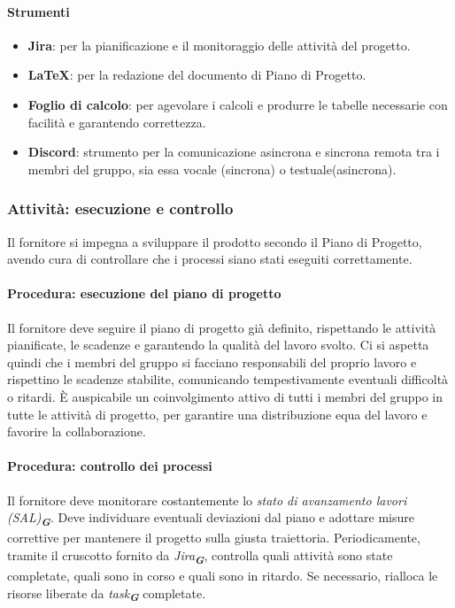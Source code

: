 \documentclass[a4paper,12pt]{article}
\newcommand{\glossario}[1]{\textit{#1}\textsubscript{\textbf{\textit{\textcolor{lightblack}{G}}}}}
\begin{document}
\paragraph{Strumenti}
\begin{itemize}
    \item \textbf{Jira}: per la pianificazione e il monitoraggio delle attività del progetto.
    \item \textbf{\LaTeX}: per la redazione del documento di Piano di Progetto.
    \item \textbf{Foglio di calcolo}: per agevolare i calcoli e produrre le tabelle necessarie con facilità e garantendo correttezza.
    \item \textbf{Discord}: strumento per la comunicazione asincrona e sincrona remota tra i membri del gruppo, sia essa vocale (sincrona) o testuale(asincrona).
\end{itemize}

\subsubsection{Attività: esecuzione e controllo}
Il fornitore si impegna a sviluppare il prodotto secondo il Piano di Progetto,
avendo cura di controllare che i processi siano stati eseguiti correttamente.

\paragraph{Procedura: esecuzione del piano di progetto}
Il fornitore deve seguire il piano di progetto già definito, rispettando le
attività pianificate, le scadenze e garantendo la qualità del lavoro svolto. Ci
si aspetta quindi che i membri del gruppo si facciano responsabili del proprio
lavoro e rispettino le scadenze stabilite, comunicando tempestivamente
eventuali difficoltà o ritardi. È auspicabile un coinvolgimento attivo di tutti
i membri del gruppo in tutte le attività di progetto, per garantire una
distribuzione equa del lavoro e favorire la collaborazione.

\paragraph{Procedura: controllo dei processi}
Il fornitore deve monitorare costantemente lo \glossario{stato di avanzamento
    lavori (SAL)}. Deve individuare eventuali deviazioni dal piano e adottare misure
correttive per mantenere il progetto sulla giusta traiettoria. Periodicamente,
tramite il cruscotto fornito da \glossario{Jira}, controlla quali attività sono state
completate, quali sono in corso e quali sono in ritardo. Se necessario,
rialloca le risorse liberate da \glossario{task} completate.
\end{document}
